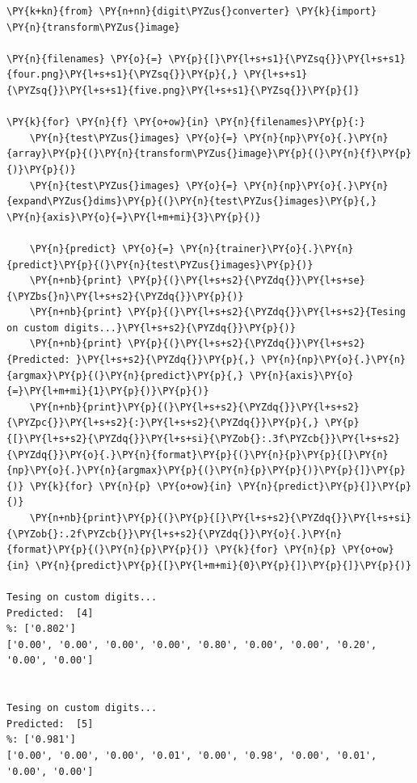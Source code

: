 \begin{tcolorbox}[breakable, size=fbox, boxrule=1pt, pad at break*=1mm,colback=cellbackground, colframe=cellborder]
\begin{Verbatim}[commandchars=\\\{\}]
\PY{k+kn}{from} \PY{n+nn}{digit\PYZus{}converter} \PY{k}{import} \PY{n}{transform\PYZus{}image}
	
\PY{n}{filenames} \PY{o}{=} \PY{p}{[}\PY{l+s+s1}{\PYZsq{}}\PY{l+s+s1}{four.png}\PY{l+s+s1}{\PYZsq{}}\PY{p}{,} \PY{l+s+s1}{\PYZsq{}}\PY{l+s+s1}{five.png}\PY{l+s+s1}{\PYZsq{}}\PY{p}{]}
	
\PY{k}{for} \PY{n}{f} \PY{o+ow}{in} \PY{n}{filenames}\PY{p}{:}
    \PY{n}{test\PYZus{}images} \PY{o}{=} \PY{n}{np}\PY{o}{.}\PY{n}{array}\PY{p}{(}\PY{n}{transform\PYZus{}image}\PY{p}{(}\PY{n}{f}\PY{p}{)}\PY{p}{)}
    \PY{n}{test\PYZus{}images} \PY{o}{=} \PY{n}{np}\PY{o}{.}\PY{n}{expand\PYZus{}dims}\PY{p}{(}\PY{n}{test\PYZus{}images}\PY{p}{,} \PY{n}{axis}\PY{o}{=}\PY{l+m+mi}{3}\PY{p}{)}
	
    \PY{n}{predict} \PY{o}{=} \PY{n}{trainer}\PY{o}{.}\PY{n}{predict}\PY{p}{(}\PY{n}{test\PYZus{}images}\PY{p}{)}
    \PY{n+nb}{print} \PY{p}{(}\PY{l+s+s2}{\PYZdq{}}\PY{l+s+se}{\PYZbs{}n}\PY{l+s+s2}{\PYZdq{}}\PY{p}{)}
    \PY{n+nb}{print} \PY{p}{(}\PY{l+s+s2}{\PYZdq{}}\PY{l+s+s2}{Tesing on custom digits...}\PY{l+s+s2}{\PYZdq{}}\PY{p}{)}
    \PY{n+nb}{print} \PY{p}{(}\PY{l+s+s2}{\PYZdq{}}\PY{l+s+s2}{Predicted: }\PY{l+s+s2}{\PYZdq{}}\PY{p}{,} \PY{n}{np}\PY{o}{.}\PY{n}{argmax}\PY{p}{(}\PY{n}{predict}\PY{p}{,} \PY{n}{axis}\PY{o}{=}\PY{l+m+mi}{1}\PY{p}{)}\PY{p}{)}
    \PY{n+nb}{print}\PY{p}{(}\PY{l+s+s2}{\PYZdq{}}\PY{l+s+s2}{\PYZpc{}}\PY{l+s+s2}{:}\PY{l+s+s2}{\PYZdq{}}\PY{p}{,} \PY{p}{[}\PY{l+s+s2}{\PYZdq{}}\PY{l+s+si}{\PYZob{}:.3f\PYZcb{}}\PY{l+s+s2}{\PYZdq{}}\PY{o}{.}\PY{n}{format}\PY{p}{(}\PY{n}{p}\PY{p}{[}\PY{n}{np}\PY{o}{.}\PY{n}{argmax}\PY{p}{(}\PY{n}{p}\PY{p}{)}\PY{p}{]}\PY{p}{)} \PY{k}{for} \PY{n}{p} \PY{o+ow}{in} \PY{n}{predict}\PY{p}{]}\PY{p}{)}
    \PY{n+nb}{print}\PY{p}{(}\PY{p}{[}\PY{l+s+s2}{\PYZdq{}}\PY{l+s+si}{\PYZob{}:.2f\PYZcb{}}\PY{l+s+s2}{\PYZdq{}}\PY{o}{.}\PY{n}{format}\PY{p}{(}\PY{n}{p}\PY{p}{)} \PY{k}{for} \PY{n}{p} \PY{o+ow}{in} \PY{n}{predict}\PY{p}{[}\PY{l+m+mi}{0}\PY{p}{]}\PY{p}{]}\PY{p}{)}

Tesing on custom digits...
Predicted:  [4]
%: ['0.802']
['0.00', '0.00', '0.00', '0.00', '0.80', '0.00', '0.00', '0.20', '0.00', '0.00']


Tesing on custom digits...
Predicted:  [5]
%: ['0.981']
['0.00', '0.00', '0.00', '0.01', '0.00', '0.98', '0.00', '0.01', '0.00', '0.00']
\end{Verbatim}
\end{tcolorbox}

